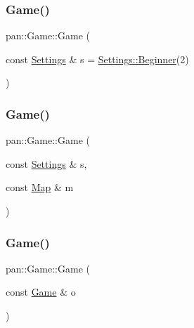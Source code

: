 \subsubsection{\texorpdfstring{Game()}{Game()}\hspace{0.1cm}{\footnotesize\ttfamily [1/4]}}
{\footnotesize\ttfamily pan\+::\+Game\+::\+Game (\begin{DoxyParamCaption}\item[{const \hyperlink{classpan_1_1_settings}{Settings} \&}]{s = {\ttfamily \hyperlink{classpan_1_1_settings_a908b6305091cf8d02bb4179dcbbe4ad1}{Settings\+::\+Beginner}(2)} }\end{DoxyParamCaption})}

\mbox{\label{classpan_1_1_game_a9dac7dcdc205455639eede641780b701}} 
\subsubsection{\texorpdfstring{Game()}{Game()}\hspace{0.1cm}{\footnotesize\ttfamily [2/4]}}
{\footnotesize\ttfamily pan\+::\+Game\+::\+Game (\begin{DoxyParamCaption}\item[{const \hyperlink{classpan_1_1_settings}{Settings} \&}]{s,  }\item[{const \hyperlink{classpan_1_1_map}{Map} \&}]{m }\end{DoxyParamCaption})}

\mbox{\label{classpan_1_1_game_a95d70ce4840b773525736ee5019433c6}} 
\subsubsection{\texorpdfstring{Game()}{Game()}\hspace{0.1cm}{\footnotesize\ttfamily [3/4]}}
{\footnotesize\ttfamily pan\+::\+Game\+::\+Game (\begin{DoxyParamCaption}\item[{const \hyperlink{classpan_1_1_game}{Game} \&}]{o }\end{DoxyParamCaption})}

\mbox{\label{classpan_1_1_game_aedf6e96723a924c772d88f8e7bbee4d8}} 
